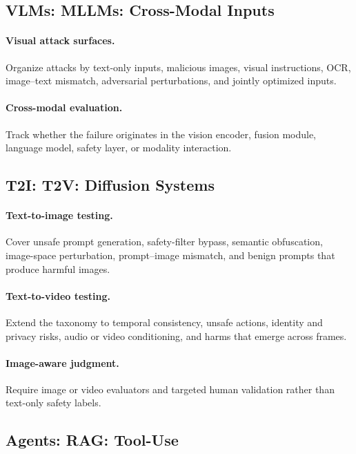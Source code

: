 \subsection{VLMs: MLLMs: Cross-Modal Inputs}

\paragraph{Visual attack surfaces.}
Organize attacks by text-only inputs, malicious images, visual instructions, OCR, image--text mismatch, adversarial perturbations, and jointly optimized inputs.

\paragraph{Cross-modal evaluation.}
Track whether the failure originates in the vision encoder, fusion module, language model, safety layer, or modality interaction.

\subsection{T2I: T2V: Diffusion Systems}

\paragraph{Text-to-image testing.}
Cover unsafe prompt generation, safety-filter bypass, semantic obfuscation, image-space perturbation, prompt--image mismatch, and benign prompts that produce harmful images.

\paragraph{Text-to-video testing.}
Extend the taxonomy to temporal consistency, unsafe actions, identity and privacy risks, audio or video conditioning, and harms that emerge across frames.

\paragraph{Image-aware judgment.}
Require image or video evaluators and targeted human validation rather than text-only safety labels.

\subsection{Agents: RAG: Tool-Use}

